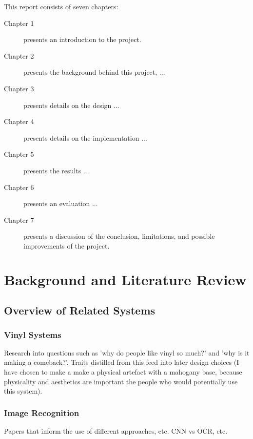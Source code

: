       This report consists of seven chapters:
      \begin{description}
      \item[Chapter 1] presents an introduction to the project.
      \item[Chapter 2] presents the background behind this project, ...
      \item[Chapter 3] presents details on the design ...
      \item[Chapter 4] presents details on the implementation ...
      \item[Chapter 5] presents the results ...
      \item[Chapter 6] presents an evaluation  ...
      \item[Chapter 7] presents a discussion of the conclusion, limitations, and possible improvements of the project.
  \end{description}
  
  
  \section{Background and Literature Review} %
  
      \subsection{Overview of Related Systems}
          \subsubsection{Vinyl Systems}
              Research into questions such as 'why do people like vinyl so much?' and 'why is it making a comeback?'. Traits distilled from this feed into later design choices (I have chosen to make a make a physical artefact with a mahogany base, because physicality and aesthetics are important the people who would potentially use this system).
  
          \subsubsection{Image Recognition}
              Papers that inform the use of different approaches, etc.
              CNN vs OCR, etc.
  
